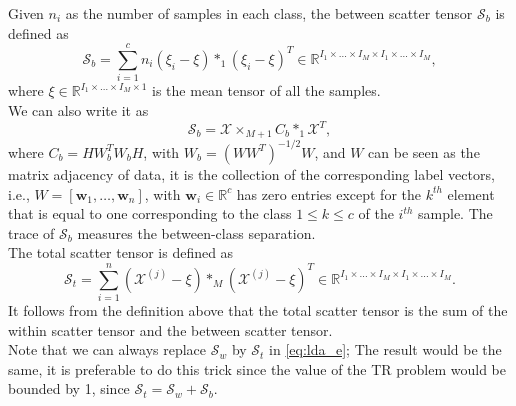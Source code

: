 \documentclass{siamltex}
\begin{document}
Given $n_i$ as the number of samples in each class, the between scatter tensor $\mathcal{S}_b$ is defined as
\begin{equation}
\mathcal{S}_b=\sum_{i=1}^{c} n_i (\xi_i-\xi) *_1 (\xi_i-\xi)^T \in \mathbb{R}^{I_1 \times \ldots \times I_M \times I_1 \times \ldots \times I_M},
\end{equation}
where $\xi \in \mathbb{R}^{I_1 \times \ldots \times I_M \times 1}$ is the mean tensor of all the samples.\\
We can also write it as
\begin{equation}
\mathcal{S}_b= \mathcal{X} \times_{M+1} C_b *_1 \mathcal{X}^T,
\end{equation}
where $C_b=H W_b^T W_b H$, with $W_b=(WW^T)^{-1/2} W$, and $W$ can be seen as the matrix adjacency of data, it is the collection of the corresponding label vectors, i.e., $W=[\mathbf{w}_1, \ldots, \mathbf{w}_n]$, with $\mathbf{w}_i \in \mathbb{R}^c$ has zero entries except for the $k^{th}$ element that is equal to one corresponding to the class $1 \leq k \leq c$ of the $i^{th}$ sample.
The trace of $\mathcal{S}_b$ measures the between-class separation.\\

The total scatter tensor is defined as
\begin{equation}
 \mathcal{S}_t=\sum_{i=1}^{n} (\mathcal{X}^{(j)}-\xi) *_M (\mathcal{X}^{(j)}-\xi)^T \in \mathbb{R}^{I_1 \times \ldots \times I_M \times I_1 \times \ldots \times I_M}.
 \end{equation}
It follows from the definition above that the total scatter tensor is the sum of the within scatter tensor and the between scatter tensor.\\
Note that we can always replace $\mathcal{S}_w$ by $\mathcal{S}_t$ in \ref{eq:lda_e}; The result would be the same, it is preferable to do this trick since the value of the TR problem would be bounded by 1, since $\mathcal{S}_t=\mathcal{S}_w+\mathcal{S}_b$.


\end{document}
